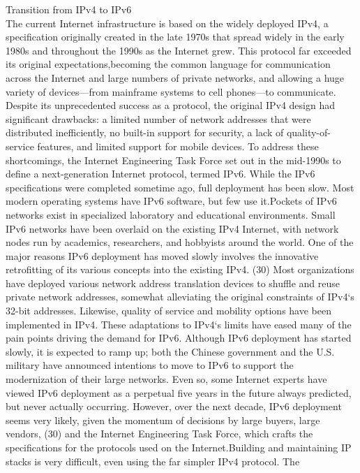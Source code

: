 \documentclass[11pt,a4paper]{article}
\begin{document}
Transition from IPv4 to IPv6\\
 
The current Internet infrastructure is based on the widely deployed IPv4, a specification originally created in the late 1970s that spread widely in the early
1980s and throughout the 1990s as the Internet grew. This protocol far exceeded its original expectations,becoming the common language for communication
across the Internet and large numbers of private networks, and allowing a huge variety of devices—from mainframe systems to cell phones—to communicate.
Despite its unprecedented success as a protocol, the original IPv4 design had significant drawbacks: a limited number of network addresses that were
distributed inefficiently, no built-in support for security, a lack of quality-of-service features, and limited support
for mobile devices. To address these shortcomings, the Internet
Engineering Task Force set out in the mid-1990s to define a next-generation Internet protocol, termed IPv6. While the IPv6 specifications were completed sometime ago, full deployment has been slow. Most modern
operating systems have IPv6 software, but few use it.Pockets of IPv6 networks exist in specialized laboratory and educational environments. Small IPv6 networks
have been overlaid on the existing IPv4 Internet, with network nodes run by academics, researchers, and hobbyists around the world. One of the major reasons
IPv6 deployment has moved slowly involves the innovative retrofitting of its various concepts into the existing IPv4. (30) Most organizations have deployed
various network address translation devices to shuffle and reuse private network addresses, somewhat alleviating the original constraints of IPv4‘s 32-bit
addresses. Likewise, quality of service and mobility options have been implemented in IPv4. These adaptations to IPv4‘s limits have eased many of the pain points driving the demand for IPv6. Although IPv6 deployment has started slowly,
it is expected to ramp up; both the Chinese government and the U.S. military have announced intentions to move to IPv6 to support the modernization of their
large networks. Even so, some Internet experts have viewed IPv6 deployment as a perpetual five years in the future always predicted, but never actually
occurring. However, over the next decade, IPv6 deployment seems very likely, given the momentum of decisions by large buyers, large vendors, (30) and the
Internet Engineering Task Force, which crafts the specifications for the protocols used on the Internet.Building and maintaining IP stacks is very
difficult, even using the far simpler IPv4 protocol. The
\end{document}
